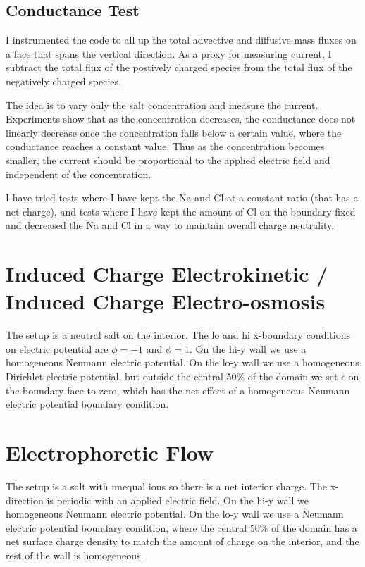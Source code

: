 \documentclass[final]{siamltex}
\begin{document}
\subsection{Conductance Test}
I instrumented the code to all up the total advective and diffusive mass fluxes on a face
that spans the vertical direction.  As a proxy for measuring current, I subtract
the total flux of the postively charged species from the total flux of the negatively
charged species.

The idea is to vary only the salt concentration and measure the current.  Experiments
show that as the concentration decreases, the conductance does not linearly decrease once
the concentration falls below a certain value, where the conductance reaches
a constant value.  Thus as the concentration becomes smaller, the current should be
proportional to the applied electric field and independent of the concentration.

I have tried tests where I have kept the Na and Cl at a constant ratio (that has
a net charge), and tests where I have kept the amount of Cl on the boundary
fixed and decreased the Na and Cl in a way to maintain overall charge neutrality.

\section{Induced Charge Electrokinetic / Induced Charge Electro-osmosis}
The setup is a neutral salt on the interior.
The lo and hi x-boundary conditions on electric potential
are $\phi=-1$ and $\phi=1$.
On the hi-y wall we use a homogeneous Neumann electric potential.
On the lo-y wall we use a homogeneous Dirichlet electric potential,
but outside the central 50\% of the domain we set $\epsilon$ on the
boundary face to zero, which has the net effect of a homogeneous
Neumann electric potential boundary condition.

\section{Electrophoretic Flow}
The setup is a salt with unequal ions so there is a net interior charge.
The x-direction is periodic with an applied electric field.
On the hi-y wall we homogeneous Neumann electric potential.
On the lo-y wall we use a Neumann electric potential boundary condition, where the
central 50\% of the domain has a net surface charge density to match
the amount of charge on the interior, and the rest of the wall is homogeneous.
\end{document}
